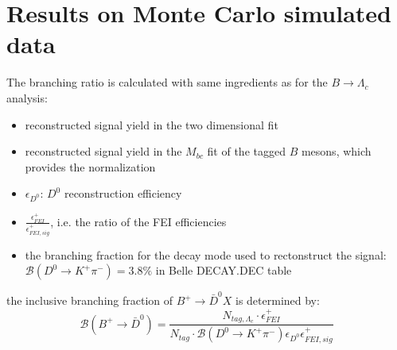 \section{Results on Monte Carlo simulated data}
The branching ratio is calculated with same ingredients as for the $B \rightarrow \Lambda_c$  analysis:
\begin{itemize}
  \item reconstructed signal yield in the two dimensional fit
  \item reconstructed signal yield in the $M_{bc}$ fit of the tagged $B$ mesons, which provides the normalization
  \item $\epsilon_{D^0}$: $D^0$ reconstruction efficiency 
  \item $\frac{\epsilon^{+}_{FEI}}{ \epsilon^{+}_{FEI,  sig }}$, i.e. the ratio of the FEI efficiencies
  \item the branching fraction for the decay mode used to rectonstruct the signal: $\mathcal{B}(D^0 \rightarrow K^+ \pi^-) = 3.8\% $ in Belle DECAY.DEC table
\end{itemize}

\vspace{0.2 cm}
the inclusive branching fraction of $B^+  \rightarrow \bar{D}^0 X$ is determined by: 
\begin{equation}
  \mathcal{B}(B^+ \rightarrow \bar{D}^0) = \frac{ N_{tag, \Lambda_c}  \cdot  \epsilon^{+}_{FEI}}{N_{tag} \cdot \mathcal{B}(D^0 \rightarrow K^+ \pi^-) \epsilon_{D^0}  \epsilon^{+}_{FEI,  sig} }
\end{equation}

